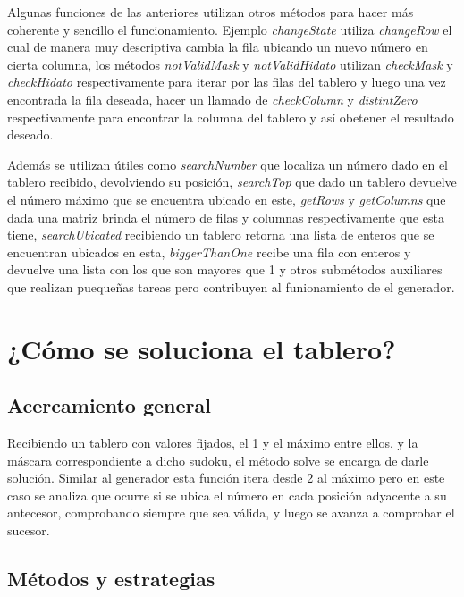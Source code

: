 \documentclass[10pt]{amsart}
\begin{document}
    Algunas funciones de las anteriores utilizan otros m\'etodos para hacer m\'as coherente y sencillo el funcionamiento. Ejemplo \textit{changeState} utiliza \textit{changeRow} el cual de manera muy descriptiva cambia la fila ubicando un nuevo n\'umero en cierta columna, los m\'etodos \textit{notValidMask} y \textit{notValidHidato} utilizan \textit{checkMask} y \textit{checkHidato} respectivamente para iterar por las filas del tablero y luego una vez encontrada la fila deseada, hacer un llamado de \textit{checkColumn} y \textit{distintZero} respectivamente para encontrar la columna del tablero y as\'i obetener el resultado deseado.
	 
    Adem\'as se utilizan \'utiles como \textit{searchNumber} que localiza un n\'umero dado en el tablero recibido, devolviendo su posici\'on, \textit{searchTop} que dado un tablero devuelve el número m\'aximo que se encuentra ubicado en este, \textit{getRows} y \textit{getColumns} que dada una matriz brinda el n\'umero de filas y columnas respectivamente que esta tiene, \textit{searchUbicated} recibiendo un tablero retorna una lista de enteros que se encuentran ubicados en esta, \textit{biggerThanOne} recibe una fila con enteros y devuelve una lista con los que son mayores que 1 y otros subm\'etodos auxiliares que realizan puequeñas tareas pero contribuyen al funionamiento de el generador.
	 
    \section*{¿C\'omo se soluciona el tablero?}
	 
    \subsection*{Acercamiento general}
	
    Recibiendo un tablero con valores fijados, el 1 y el m\'aximo entre ellos, y la m\'ascara correspondiente a dicho sudoku, el m\'etodo solve se encarga de darle soluci\'on. Similar al generador esta funci\'on itera desde 2 al m\'aximo pero en este caso se analiza que ocurre si se ubica el n\'umero en cada posici\'on adyacente a su antecesor, comprobando siempre que sea v\'alida, y luego se avanza a comprobar el sucesor.
	 
    \subsection*{M\'etodos y estrategias}
	
\end{document}
